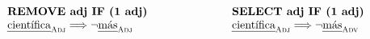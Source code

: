 \begin{equation}
\begin{array}{l @{\hspace{2.5cm}} l}
\text{\cgrule{REMOVE adj IF (1 adj)}}   &  \text{\cgrule{SELECT adj IF (1 adj)}} \\
\cientificaAdj \Longrightarrow \neg{}\masAdj &  \cientificaAdj \Longrightarrow  \neg{}\masAdv \\
\end{array}
\label{eq:singleCondition}
\end{equation}

%
%
%
